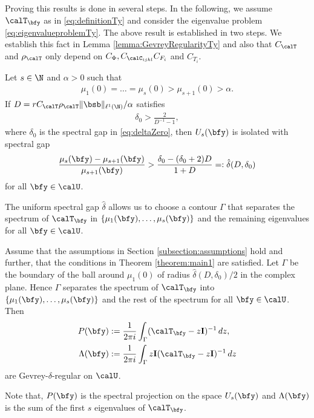 Proving this results is done in several steps.
In the following, we assume $\calT_\bfy$ as in \eqref{eq:definitionTy} and consider the eigenvalue problem \eqref{eq:eigenvalueproblemTy}.
The above result is established in two steps.
We establish this fact in Lemma \ref{lemma:GevreyRegularityTy} and also that $C_{\calT}$ and $\rho_{\calT}$ only depend on $C_{\Phi}, C_{\calC_{ijkl}} C_{F_i}$ and $C_{T_i}$. 
\begin{theorem}\label{theorem:main1}
    Let $ s \in \N$ and $\alpha > 0$ such that
    \begin{align*}
        \mu_1(0) = \ldots = \mu_s(0) > \mu_{s+1}(0) > \alpha.
    \end{align*}
    If $ D =  r C_{\calT} \rho_{\calT} \|\bsb \|_{\ell^1(\N)} / \alpha$ satisfies
    \begin{align}\label{eq:spectralgapRef}
        \delta_0  >  \frac{2}{D^{-1}-1},
    \end{align} where $\delta_0$ is the spectral gap in \eqref{eq:deltaZero}, then
    $U_s(\bfy) $ is isolated with spectral gap
 \begin{align}\label{eq:spectralgap}
         \frac{\mu_{s}(\bfy) - \mu_{s+1}(\bfy)}{\mu_{s+1}(\bfy)} > \frac{ \delta_0  - ( \delta_0 +2)D}{1+ D} =: \hat \delta(D, \delta_0)
    \end{align}
    for all $\bfy \in \calU$.
\end{theorem}
The uniform spectral gap $\hat \delta$ allows us to choose a contour $\Gamma$ that separates the spectrum of $\calT_\bfy$ in $\{ \mu_1(\bfy), \ldots, \mu_s(\bfy) \}$ and the remaining eigenvalues for all $\bfy \in \calU$.
\begin{theorem}\label{theorem:main2} Assume that the assumptions in Section \ref{subsection:assumptions} hold and further, that the conditions in Theorem \ref{theorem:main1} are satisfied. 
Let $\Gamma$ be the boundary of the ball around $\mu_1(0)$ of radius  $\hat \delta(D, \delta_0)/2$ in the complex plane. Hence $\Gamma$ separates the spectrum of $\calT_\bfy$ into $\{ \mu_1(\bfy), \ldots, \mu_s(\bfy) \}$ and the rest of the spectrum for all $\bfy \in \calU$. 
Then 
\begin{align}\label{eq:spectralProjector}
    P(\bfy) &:= \frac 1 {2\pi i} \int_{\Gamma} (\calT_{\bfy} - z \mathbf{I})^{-1}  \mathop{dz}, \\
    \label{eq:CauchyIntegralFormulaForD}
    \Lambda(\bfy) &:=  \frac  1 {2\pi i} \int_{\Gamma} z \mathbf{I} (\calT_{\bfy} - z \mathbf{I})^{-1}\mathop{dz}  
\end{align}
    are Gevrey-$\delta$-regular on $\calU$.
\end{theorem}
Note that, $P(\bfy)$ is the spectral projection on the space $U_s(\bfy)$ and $\Lambda(\bfy)$ is the sum of the first $s$ eigenvalues of $\calT_{\bfy}$. %



